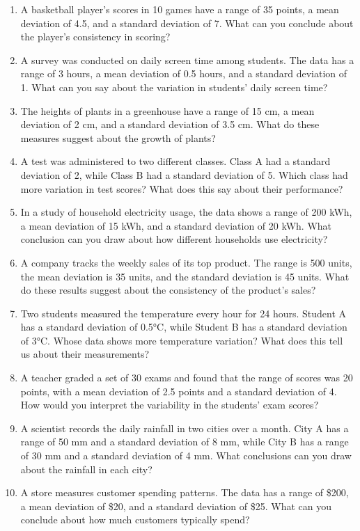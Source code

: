 \begin{enumerate}
    \item A basketball player’s scores in 10 games have a range of 35 points, a mean deviation of 4.5, and a standard deviation of 7. What can you conclude about the player’s consistency in scoring?
    \item A survey was conducted on daily screen time among students. The data has a range of 3 hours, a mean deviation of 0.5 hours, and a standard deviation of 1. What can you say about the variation in students' daily screen time?
    \item The heights of plants in a greenhouse have a range of 15 cm, a mean deviation of 2 cm, and a standard deviation of 3.5 cm. What do these measures suggest about the growth of plants?
    \item A test was administered to two different classes. Class A had a standard deviation of 2, while Class B had a standard deviation of 5. Which class had more variation in test scores? What does this say about their performance?
    \item In a study of household electricity usage, the data shows a range of 200 kWh, a mean deviation of 15 kWh, and a standard deviation of 20 kWh. What conclusion can you draw about how different households use electricity?
    \item A company tracks the weekly sales of its top product. The range is 500 units, the mean deviation is 35 units, and the standard deviation is 45 units. What do these results suggest about the consistency of the product’s sales?
    \item Two students measured the temperature every hour for 24 hours. Student A has a standard deviation of 0.5°C, while Student B has a standard deviation of 3°C. Whose data shows more temperature variation? What does this tell us about their measurements?
    \item A teacher graded a set of 30 exams and found that the range of scores was 20 points, with a mean deviation of 2.5 points and a standard deviation of 4. How would you interpret the variability in the students’ exam scores?
    \item A scientist records the daily rainfall in two cities over a month. City A has a range of 50 mm and a standard deviation of 8 mm, while City B has a range of 30 mm and a standard deviation of 4 mm. What conclusions can you draw about the rainfall in each city?
    \item A store measures customer spending patterns. The data has a range of \$200, a mean deviation of \$20, and a standard deviation of \$25. What can you conclude about how much customers typically spend?
\end{enumerate}

